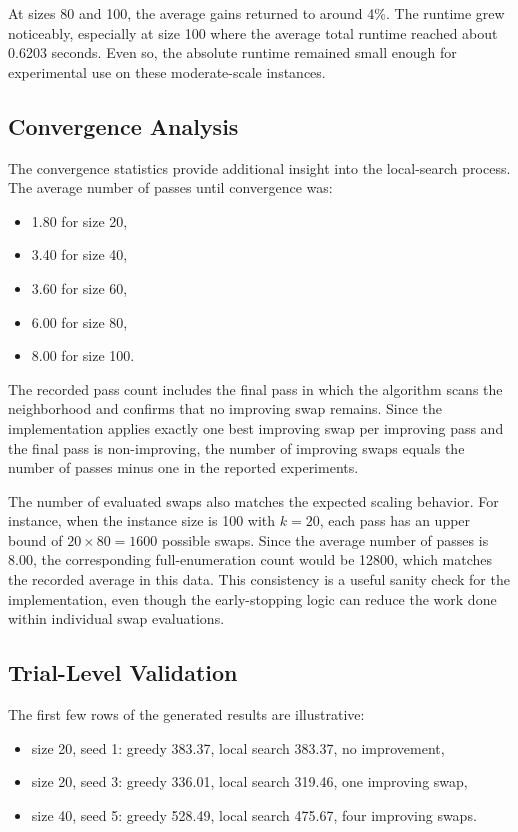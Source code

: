 \documentclass[11pt]{article}
\begin{document}
At sizes 80 and 100, the average gains returned to around 4\%. The runtime grew noticeably, especially at size 100 where the average total runtime reached about 0.6203 seconds. Even so, the absolute runtime remained small enough for experimental use on these moderate-scale instances.

\subsection{Convergence Analysis}
The convergence statistics provide additional insight into the local-search process. The average number of passes until convergence was:
\begin{itemize}
    \item 1.80 for size 20,
    \item 3.40 for size 40,
    \item 3.60 for size 60,
    \item 6.00 for size 80,
    \item 8.00 for size 100.
\end{itemize}

The recorded pass count includes the final pass in which the algorithm scans the neighborhood and confirms that no improving swap remains. Since the implementation applies exactly one best improving swap per improving pass and the final pass is non-improving, the number of improving swaps equals the number of passes minus one in the reported experiments.

The number of evaluated swaps also matches the expected scaling behavior. For instance, when the instance size is 100 with $k=20$, each pass has an upper bound of $20 \times 80 = 1600$ possible swaps. Since the average number of passes is 8.00, the corresponding full-enumeration count would be 12800, which matches the recorded average in this data. This consistency is a useful sanity check for the implementation, even though the early-stopping logic can reduce the work done within individual swap evaluations.

\subsection{Trial-Level Validation}
The first few rows of the generated results are illustrative:
\begin{itemize}
    \item size 20, seed 1: greedy 383.37, local search 383.37, no improvement,
    \item size 20, seed 3: greedy 336.01, local search 319.46, one improving swap,
    \item size 40, seed 5: greedy 528.49, local search 475.67, four improving swaps.
\end{itemize}
\end{document}
